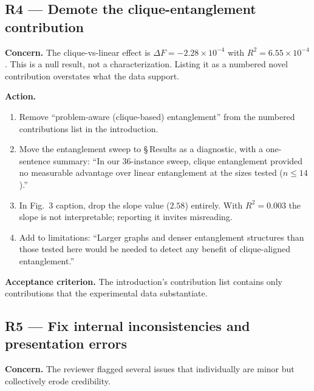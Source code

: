 \documentclass[conference,10pt]{IEEEtran}
\begin{document}
\subsection{R4 --- Demote the clique-entanglement contribution}

\textbf{Concern.} The clique-vs-linear effect is $\Delta F = -2.28\times
10^{-4}$ with $R^2 = 6.55\times 10^{-4}$. This is a null result, not a
characterization. Listing it as a numbered novel contribution overstates
what the data support.

\textbf{Action.}
\begin{enumerate}[leftmargin=*]
    \item Remove ``problem-aware (clique-based) entanglement'' from the
    numbered contributions list in the introduction.
    \item Move the entanglement sweep to \S\,Results as a diagnostic, with
    a one-sentence summary: ``In our 36-instance sweep, clique
    entanglement provided no measurable advantage over linear entanglement
    at the sizes tested ($n \le 14$).''
    \item In Fig.~3 caption, drop the slope value ($2.58$) entirely. With
    $R^2 = 0.003$ the slope is not interpretable; reporting it invites
    misreading.
    \item Add to limitations: ``Larger graphs and denser entanglement
    structures than those tested here would be needed to detect any
    benefit of clique-aligned entanglement.''
\end{enumerate}

\textbf{Acceptance criterion.} The introduction's contribution list
contains only contributions that the experimental data substantiate.

\subsection{R5 --- Fix internal inconsistencies and presentation errors}

\textbf{Concern.} The reviewer flagged several issues that individually
are minor but collectively erode credibility.
\end{document}
